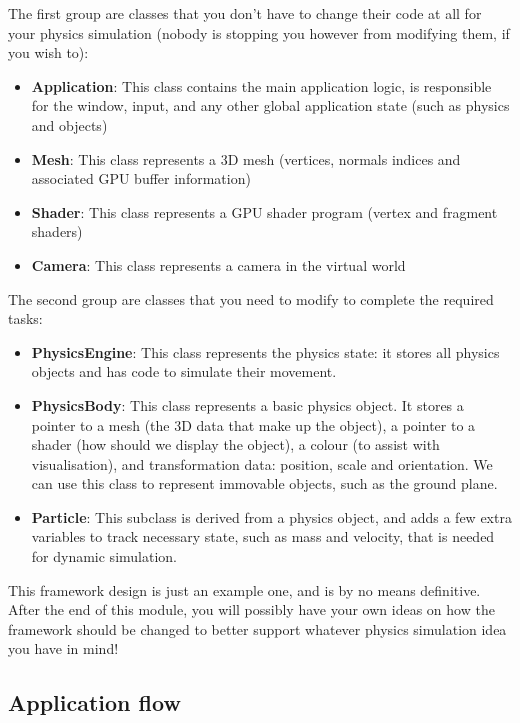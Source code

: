 \documentclass[12pt]{article}
\begin{document}
The first group are classes that you don't have to change their code at all for your physics simulation (nobody is stopping you however from modifying them, if you wish to):

\begin{itemize}
\item \textbf{Application}: This class contains the main application logic, is responsible for the window, input, and any other global application state (such as physics and objects)
\item \textbf{Mesh}: This class represents a 3D mesh (vertices, normals indices and associated GPU buffer information)
\item \textbf{Shader}: This class represents a GPU shader program (vertex and fragment shaders)
\item \textbf{Camera}: This class represents a camera in the virtual world
\end{itemize}

The second group are classes that you need to modify to complete the required tasks:

\begin{itemize}
\item \textbf{PhysicsEngine}: This class represents the physics state: it stores all physics objects and has code to simulate their movement.
\item \textbf{PhysicsBody}: This class represents a basic physics object. It stores a pointer to a mesh (the 3D data that make up the object), a pointer to a shader (how should we display the object), a colour (to assist with visualisation), and transformation data: position, scale and orientation. We can use this class to represent immovable objects, such as the ground plane.
\item \textbf{Particle}: This subclass is derived from a physics object, and adds a few extra variables to track necessary state, such as mass and velocity, that is needed for dynamic simulation.
\end{itemize}

This framework design is just an example one, and is by no means definitive. After the end of this module, you will possibly have your own ideas on how the framework should be changed to better support whatever physics simulation idea you have in mind! 

\subsection*{Application flow}
\end{document}

